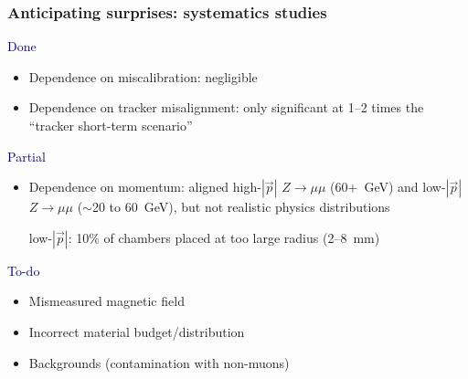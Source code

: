 \documentclass[compress]{beamer}
\begin{document}
\begin{frame}
\frametitle{Anticipating surprises: systematics studies}

\vfill
{\large \textcolor{darkblue}{Done}}
\begin{itemize}
\item Dependence on miscalibration: negligible

\item Dependence on tracker misalignment: only significant at 1--2
times the ``tracker short-term scenario''
\end{itemize}

\vfill
{\large \textcolor{darkblue}{Partial}}
\begin{itemize}
\item Dependence on momentum: aligned high-$|\vec{p}|$ $Z\to\mu\mu$
(60$+$~GeV) and low-$|\vec{p}|$ $Z\to\mu\mu$ ($\sim$20 to 60~GeV), but not
realistic physics distributions

\vspace{0.2 cm}
low-$|\vec{p}|$: 10\% of chambers placed at too large radius (2--8~mm)
\end{itemize}

\vfill
{\large \textcolor{darkblue}{To-do}}
\begin{itemize}
\item Mismeasured magnetic field

\item Incorrect material budget/distribution

\item Backgrounds (contamination with non-muons)
\end{itemize}
\end{frame}
\end{document}
